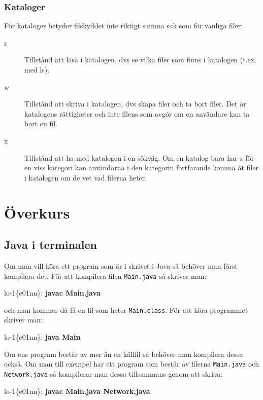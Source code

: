 \documentclass[a4paper,twocolumn]{book}
\begin{document}
\subsection{Kataloger}

För kataloger betyder filskyddet inte riktigt
samma sak som för vanliga filer:
\begin{description}
  \item[r] Tillstånd att läsa i katalogen, dvs se vilka filer som finns
    i katalogen (t.ex. med ls).
  \item[w] Tillstånd att skriva i katalogen, dvs skapa filer och ta bort
    filer. Det är katalogens rättigheter och inte filens som avgör om en
    användare kan ta bort en fil.
  \item[x] Tillstånd att ha med katalogen i en sökväg. Om en katalog
    bara har \emph{x} för en viss kategori kan användarna i den
    kategorin fortfarande komma åt filer i katalogen om de vet vad
    filerna heter.
\end{description}


\chapter{Överkurs}
\label{cha:overkurs}

\section{Java i terminalen}
Om man vill köra ett program som är i skrivet i Java så behöver man först kompilera det.
För att kompilera filen \texttt{Main.java} så skriver man:
\begin{example}
  lo-1\{e01nn\}: \textbf{javac Main.java}
\end{example}
och man kommer då få en fil som heter \texttt{Main.class}.
För att köra programmet skriver man:
\begin{example}
  lo-1\{e01nn\}: \textbf{java Main}
\end{example}

Om ens program består av mer än en källfil
så behöver man kompilera dessa också. Om man till exempel har ett program
som består av filerna \texttt{Main.java} och \texttt{Network.java} så
kompilerar man dessa tillsammans genom att skriva:

\begin{example}
  lo-1\{e01nn\}: \textbf{javac Main.java Network.java}
\end{example}
\end{document}
